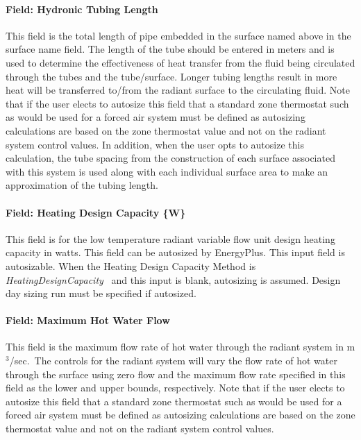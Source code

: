 \paragraph{Field: Hydronic Tubing Length}\label{field-hydronic-tubing-length-000}

This field is the total length of pipe embedded in the surface named above in the surface name field. The length of the tube should be entered in meters and is used to determine the effectiveness of heat transfer from the fluid being circulated through the tubes and the tube/surface. Longer tubing lengths result in more heat will be transferred to/from the radiant surface to the circulating fluid. Note that if the user elects to autosize this field that a standard zone thermostat such as would be used for a forced air system must be defined as autosizing calculations are based on the zone thermostat value and not on the radiant system control values. In addition, when the user opts to autosize this calculation, the tube spacing from the construction of each surface associated with this system is used along with each individual surface area to make an approximation of the tubing length.

\paragraph{Field: Heating Design Capacity \{W\}}\label{field-heating-design-capacity-w-5}

This field is for the low temperature radiant variable flow unit design heating capacity in watts. This field can be autosized by EnergyPlus. This input field is autosizable. When the Heating Design Capacity Method is \emph{HeatingDesignCapacity}~ and this input is blank, autosizing is assumed. Design day sizing run must be specified if autosized.

\paragraph{Field: Maximum Hot Water Flow}\label{field-maximum-hot-water-flow}

This field is the maximum flow rate of hot water through the radiant system in m\(^{3}\)/sec.~The controls for the radiant system will vary the flow rate of hot water through the surface using zero flow and the maximum flow rate specified in this field as the lower and upper bounds, respectively. Note that if the user elects to autosize this field that a standard zone thermostat such as would be used for a forced air system must be defined as autosizing calculations are based on the zone thermostat value and not on the radiant system control values.

